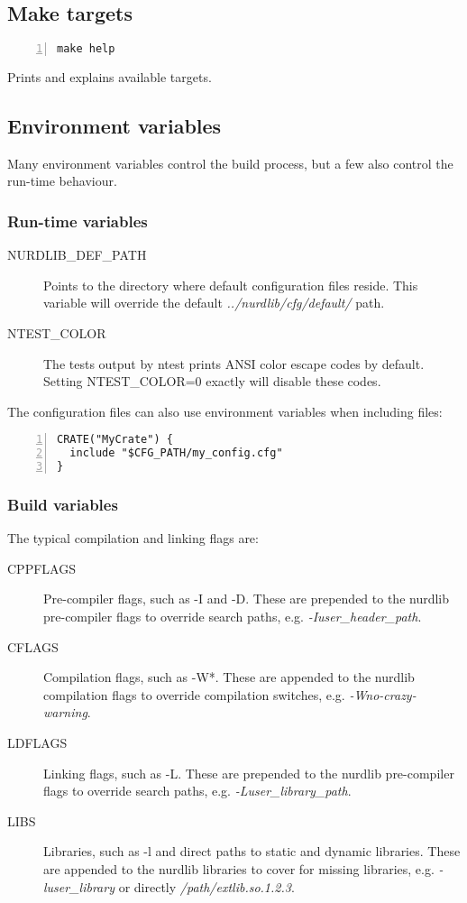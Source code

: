 \documentclass{article}
\begin{document}
\subsection{Make targets}

\begin{Verbatim}[frame=single,numbers=left]
make help
\end{Verbatim}
Prints and explains available targets.

\subsection{Environment variables}

Many environment variables control the build process, but a few also control
the run-time behaviour.

\subsubsection{Run-time variables}

\begin{description}
\item[NURDLIB\_DEF\_PATH] Points to the directory where default configuration
files reside. This variable will override the default
\emph{../nurdlib/cfg/default/} path.
\item[NTEST\_COLOR] The tests output by ntest prints ANSI color escape codes
by default. Setting NTEST\_COLOR=0 exactly will disable these codes.
\end{description}

The configuration files can also use environment variables when including
files:

\begin{Verbatim}[frame=single,numbers=left]
CRATE("MyCrate") {
  include "$CFG_PATH/my_config.cfg"
}
\end{Verbatim}

\subsubsection{Build variables}

The typical compilation and linking flags are:
\begin{description}
\item[CPPFLAGS] Pre-compiler flags, such as -I and -D. These are prepended to
the nurdlib pre-compiler flags to override search paths, e.g.
\emph{-Iuser\_header\_path}.
\item[CFLAGS] Compilation flags, such as -W*. These are appended to the
nurdlib compilation flags to override compilation switches, e.g.
\emph{-Wno-crazy-warning}.
\item[LDFLAGS] Linking flags, such as -L. These are prepended to the nurdlib
pre-compiler flags to override search paths, e.g.
\emph{-Luser\_library\_path}.
\item[LIBS] Libraries, such as -l and direct paths to static and dynamic
libraries. These are appended to the nurdlib libraries to cover for missing
libraries, e.g. \emph{-luser\_library} or directly
\emph{/path/extlib.so.1.2.3}.
\end{description}
\end{document}
